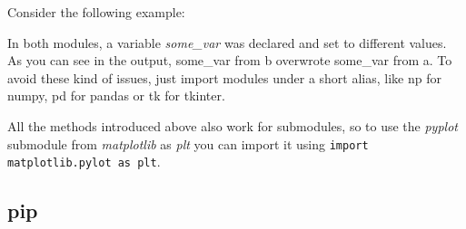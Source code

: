       Consider the following example:

      In both modules, a variable \textit{some\_var} was declared and set to different values.
      As you can see in the output, some\_var from b overwrote some\_var from a.
      To avoid these kind of issues, just import modules under a short alias, like
      np for numpy, pd for pandas or tk for tkinter.

      All the methods introduced above also work for submodules, so to use the \textit{pyplot} submodule
      from \textit{matplotlib} as \textit{plt} you can import it using
      \texttt{import matplotlib.pylot as plt}.

  \subsection{pip}